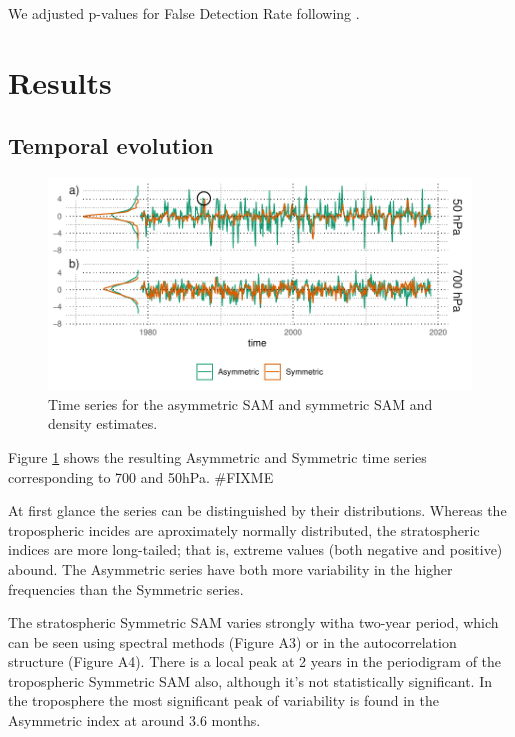 \documentclass[twocol]{ametsocV5}
\begin{document}
We adjusted p-values for False Detection Rate following
\citet{wilks2016}.

\section{Results}

\subsection{Temporal evolution}

\begin{figure}
\includegraphics{asymsam-timeseries-1} \caption[Time series for the asymmetric SAM and symmetric SAM and density estimates]{Time series for the asymmetric SAM and symmetric SAM and density estimates.}\label{fig:asymsam-timeseries}
\end{figure}

Figure \ref{fig:asymsam-timeseries} shows the resulting Asymmetric and
Symmetric time series corresponding to 700 and 50hPa. \#FIXME

At first glance the series can be distinguished by their distributions.
Whereas the tropospheric incides are aproximately normally distributed,
the stratospheric indices are more long-tailed; that is, extreme values
(both negative and positive) abound. The Asymmetric series have both
more variability in the higher frequencies than the Symmetric series.

The stratospheric Symmetric SAM varies strongly witha two-year period,
which can be seen using spectral methods (Figure A3) or in the
autocorrelation structure (Figure A4). There is a local peak at 2 years
in the periodigram of the tropospheric Symmetric SAM also, although it's
not statistically significant. In the troposphere the most significant
peak of variability is found in the Asymmetric index at around 3.6
months.
\end{document}
